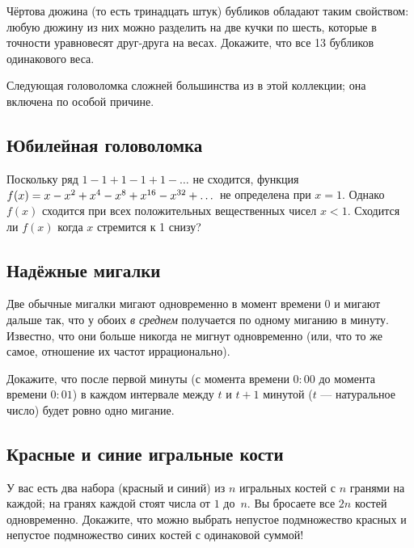 Чёртова дюжина (то есть тринадцать штук) бубликов обладают таким свойством: любую дюжину из них можно разделить на две кучки по шесть, которые в точности уравновесят друг-друга на весах.
Докажите, что все 13 бубликов одинакового веса.

\medskip

Следующая головоломка сложней большинства из в этой коллекции;
она включена по особой причине.

\subsection*{Юбилейная головоломка}

Поскольку ряд $1 - 1 + 1 - 1 + 1 - \dots$ не сходится,  функция 
$f(x)\z=x-x^2+x^4-x^8+x^{16}-x^{32}+\dots$ не определена при $x=1$.
Однако $f(x)$ сходится при всех положительных вещественных чисел $x<1$.
Сходится ли $f(x)$ когда $x$ стремится к 1 снизу?

\subsection*{Надёжные мигалки}

Две обычные мигалки мигают одновременно в момент времени $0$
и мигают дальше так, что у обоих \emph{в среднем} получается по одному миганию в минуту.
Известно, что они больше никогда не мигнут одновременно (или, что то же самое, отношение их частот иррационально).

Докажите, что после первой минуты (с момента времени $0{:}00$ до момента времени $0{:}01$) в каждом интервале между $t$ и $t + 1$ минутой ($t$ --- натуральное число) будет ровно одно мигание.

\subsection*{Красные и синие игральные кости}

У вас есть два набора (красный и синий) из $n$ игральных костей с $n$ гранями на каждой;
на гранях каждой стоят числа от $1$ до~$n$.
Вы бросаете все $2n$ костей одновременно.
Докажите, что можно выбрать непустое подмножество красных и непустое подмножество синих костей с одинаковой суммой!
